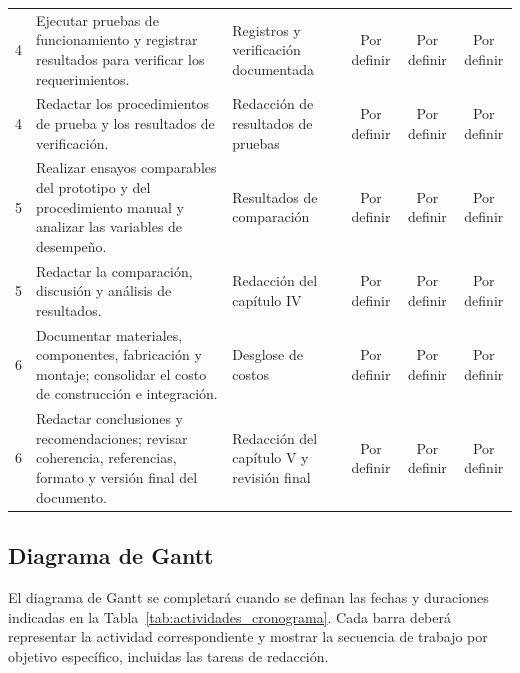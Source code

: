 \begin{table}[htbp]
\begin{tabularx}{\textwidth}{@{}p{}X p{} c c c@{}}
        4 & Ejecutar pruebas de funcionamiento y registrar resultados para verificar los requerimientos. & Registros y verificación documentada & Por definir & Por definir & Por definir \\
        4 & Redactar los procedimientos de prueba y los resultados de verificación. & Redacción de resultados de pruebas & Por definir & Por definir & Por definir \\
        5 & Realizar ensayos comparables del prototipo y del procedimiento manual y analizar las variables de desempeño. & Resultados de comparación & Por definir & Por definir & Por definir \\
        5 & Redactar la comparación, discusión y análisis de resultados. & Redacción del capítulo IV & Por definir & Por definir & Por definir \\
        6 & Documentar materiales, componentes, fabricación y montaje; consolidar el costo de construcción e integración. & Desglose de costos & Por definir & Por definir & Por definir \\
        6 & Redactar conclusiones y recomendaciones; revisar coherencia, referencias, formato y versión final del documento. & Redacción del capítulo V y revisión final & Por definir & Por definir & Por definir \\
        \bottomrule
    \end{tabularx}
\end{table}

\subsection{Diagrama de Gantt}
\label{subsec:gantt}

El diagrama de Gantt se completará cuando se definan las fechas y duraciones
indicadas en la Tabla~\ref{tab:actividades_cronograma}. Cada barra deberá
representar la actividad correspondiente y mostrar la secuencia de trabajo por
objetivo específico, incluidas las tareas de redacción.

